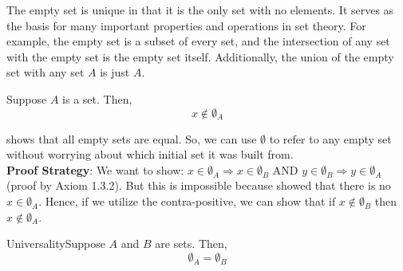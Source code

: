 \newpage

The empty set is unique in that it is the only set with no elements. It serves as the basis for many important properties and operations in set theory. For example, the empty set is a subset of every set, and the intersection of any set with the empty set is the empty set itself. Additionally, the union of the empty set with any set $A$ is just $A$.


    \begin{exercise}
        {}Suppose $A$ is a set. Then, $$x\notin \emptyset_A$$
    \end{exercise}




\begin{note}
    shows that all empty sets are equal. So, we can use $\emptyset$ to refer to any empty set without worrying about which initial set it was built from. \\
    
    \textbf{Proof Strategy}: We want to show: $x\in \emptyset_A \Rightarrow x\in \emptyset_B$ AND $y \in \emptyset_B \Rightarrow y \in \emptyset_A$ (proof by Axiom 1.3.2). But this is impossible because  showed that there is no $x\in \emptyset_A$. Hence, if we utilize the contra-positive, we can show that if $x\notin \emptyset_B$ then $ x\notin \emptyset_A$.
\end{note}

\begin{exercise}
    {Universality}Suppose $A$ and $B$ are sets. Then, $$\emptyset_A = \emptyset_B$$
    \end{exercise}


